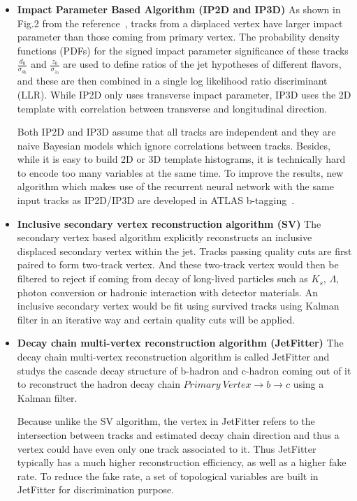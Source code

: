 \begin{itemize}				
\item \textbf{Impact Parameter Based Algorithm (IP2D and IP3D)} 	
As shown in Fig.2 from the reference~\cite{ATL-PHYS-PUB-2015-022}, tracks from a displaced vertex have larger impact parameter than those coming from primary vertex. The probability density functions (PDFs) for the signed impact parameter significance of these tracks $\frac{d_0}{\sigma_{d_0}}$ and $\frac{z_0}{\sigma_{z_0}}$ are used to define ratios of the jet hypotheses of different flavors, and these are then combined in a single log likelihood ratio discriminant (LLR). While IP2D only uses transverse impact parameter, IP3D uses the 2D template with correlation between transverse and longitudinal direction.				
\par Both IP2D and IP3D assume that all tracks are independent and they are naive Bayesian models which ignore correlations between tracks. Besides, while it is easy to build 2D or 3D template histograms, it is technically hard to encode too many variables at the same time. To improve the results, new algorithm which makes use of the recurrent neural network with the same input tracks as IP2D/IP3D are developed in ATLAS b-tagging~\cite{ATL-PHYS-PUB-2017-003}. 
\item \textbf{Inclusive secondary vertex reconstruction algorithm (SV)} 	
The secondary vertex based algorithm explicitly reconstructs an inclusive displaced secondary vertex within the jet. Tracks passing quality cuts are first paired to form two-track vertex. And these two-track vertex would then be filtered to reject if coming from decay of long-lived particles such as $K_s$, $\Lambda$, photon conversion or hadronic interaction with detector materials. An inclusive secondary vertex would be fit using survived tracks using Kalman filter in an iterative way and certain quality cuts will be applied. 				
\item \textbf{Decay chain multi-vertex reconstruction algorithm (JetFitter)} 		 	 	 		The decay chain multi-vertex reconstruction algorithm is called JetFitter and studys the cascade decay structure of b-hadron and c-hadron coming out of it to reconstruct the hadron decay chain $Primary\ Vertex \rightarrow b \rightarrow c$ using a Kalman filter.		 	 	 		
\par Because unlike the SV algorithm, the vertex in JetFitter refers to the intersection between tracks and estimated decay chain direction and thus a vertex could have even only one track associated to it. Thus JetFitter typically has a much higher reconstruction efficiency, as well as a higher fake rate. To reduce the fake rate, a set of topological variables are built in JetFitter for discrimination purpose. 
\end{itemize}		

